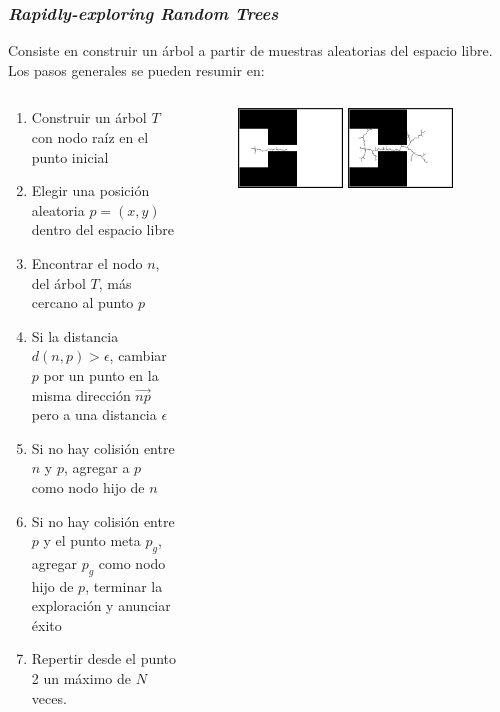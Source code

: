 \begin{frame}\frametitle{\textit{Rapidly-exploring Random Trees}}
  Consiste en construir un árbol a partir de muestras aleatorias del espacio libre. Los pasos generales se pueden resumir en:
  \begin{columns}
    \begin{column}{0.55\textwidth}
      \begin{enumerate}
      \item Construir un árbol $T$ con nodo raíz en el punto inicial
      \item Elegir una posición aleatoria $p=(x,y)$ dentro del espacio libre
      \item Encontrar el nodo $n$, del árbol $T$, más cercano al punto $p$
      \item Si la distancia $d(n, p) > \epsilon$, cambiar $p$ por un punto en la misma dirección $\overrightarrow{np}$ pero a una distancia $\epsilon$
      \item Si no hay colisión entre $n$ y $p$, agregar a $p$ como nodo hijo de $n$
      \item Si no hay colisión entre $p$ y el punto meta $p_g$, agregar $p_g$ como nodo hijo de $p$, terminar la exploración y anunciar éxito
      \item Repertir desde el punto 2 un máximo de $N$ veces.
      \end{enumerate}
    \end{column}
    \begin{column}{0.45\textwidth}
      \begin{figure}
        \centering
        \includegraphics[width=0.45\textwidth]{Figures/MotionPlanning/RRTO010.png}
        \includegraphics[width=0.45\textwidth]{Figures/MotionPlanning/RRTO0100.png}

\end{figure}
\end{column}
\end{columns}
\end{frame}
